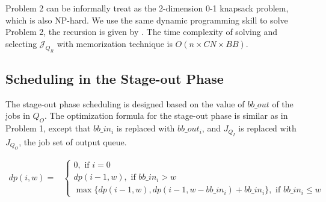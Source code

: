 Problem 2 can be informally treat as the 2-dimension 0-1 knapsack problem, which is also NP-hard.
We use the same dynamic programming skill to solve Problem 2, the recursion is given by .
The time complexity of solving  and selecting $\mathcal{J}_{Q_R}$ with memorization technique is $O(n\times CN\times BB)$.


\subsection{Scheduling in the Stage-out Phase}

The stage-out phase scheduling is designed based on the value of $bb\_out$ of the jobs in $Q_O$.
The optimization formula for the stage-out phase is similar as in Problem 1, 
except that $bb\_in_i$ is replaced with $bb\_out_i$, 
and $J_{Q_I}$ is replaced with $J_{Q_O}$, the job set of output queue.

%
%


\begin{strip}
        \begin{align}
                dp(i, w) = & 
                \left\{
                        \begin{array}{l}
                                0, \text{ if $i=0$ } \\ [0.6em]
                                dp(i-1, w), \text{ if $bb\_in_i > w$} \\ [0.6em]
                                \max \{ dp(i-1, w), dp(i-1, w-bb\_in_i) + bb\_in_i \}, \text{ if $bb\_in_i \leq w$}
                        \end{array} 
                \right.
                \label{Equ:MaxTransferDataRecursion} 
        \end{align}
\end{strip}

